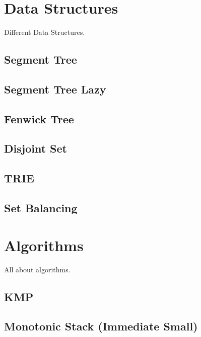 \documentclass[10pt, a4paper]{article}
\begin{document}
\begin{multicols}{2}
\section{Data Structures}
Different Data Structures.

\subsection{Segment Tree}


\subsection{Segment Tree Lazy}


\subsection{Fenwick Tree}


\subsection{Disjoint Set}


\subsection{TRIE}


\subsection{Set Balancing}


\section{Algorithms}
All about algorithms.

\subsection{KMP}


\subsection{Monotonic Stack (Immediate \allowbreak Small)}



\end{multicols}
\end{document}
